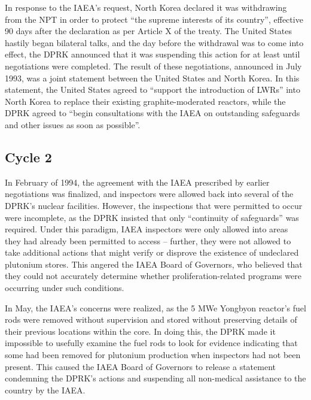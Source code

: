 \documentclass{article}
\begin{document}
In response to the IAEA’s request, North Korea declared it was withdrawing from the NPT in order to protect “the supreme interests of its country”, effective 90 days after the declaration as per Article X of the treaty\cite{npt}. The United States hastily began bilateral talks, and the day before the withdrawal was to come into effect, the DPRK announced that it was suspending this action for at least until negotiations were completed\cite{nti15}. The result of these negotiations, announced in July 1993, was a joint statement between the United States and North Korea. In this statement, the United States agreed to “support the introduction of LWRs” into North Korea to replace their existing graphite-moderated reactors, while the DPRK agreed to “begin consultations with the IAEA on outstanding safeguards and other issues as soon as possible”\cite{hayes}. 

\subsection{Cycle 2}

In February of 1994, the agreement with the IAEA prescribed by earlier negotiations was finalized, and inspectors were allowed back into several of the DPRK’s nuclear facilities\cite{davenport}. However, the inspections that were permitted to occur were incomplete, as the DPRK insisted that only “continuity of safeguards” was required\cite{iaea09}. Under this paradigm, IAEA inspectors were only allowed into areas they had already been permitted to access – further, they were not allowed to take additional actions that might verify or disprove the existence of undeclared plutonium stores. This angered the IAEA Board of Governors, who believed that they could not accurately determine whether proliferation-related programs were occurring under such conditions\cite{davenport}.

In May, the IAEA’s concerns were realized, as the 5 MWe Yongbyon reactor’s fuel rods were removed without supervision and stored without preserving details of their previous locations within the core. In doing this, the DPRK made it impossible to usefully examine the fuel rods to look for evidence indicating that some had been removed for plutonium production when inspectors had not been present\cite{nobacksies}. This caused the IAEA Board of Governors to release a statement condemning the DPRK’s actions and suspending all non-medical assistance to the country by the IAEA\cite{iaea94}.
\end{document}
